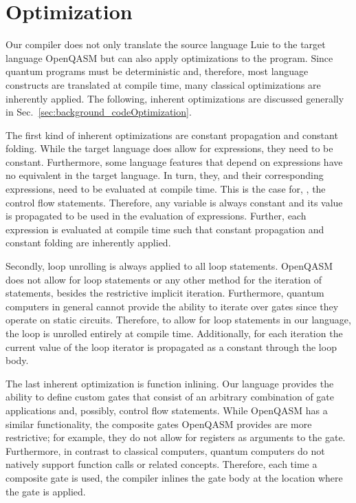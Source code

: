 \section{Optimization}
\label{sec:concept_optimization}
Our compiler does not only translate the source language Luie to the target language OpenQASM but can also apply optimizations to the program. Since quantum programs must be deterministic and, therefore, most language constructs are translated at compile time, many classical optimizations are inherently applied. The following, inherent optimizations are discussed generally in Sec.~\ref{sec:background_codeOptimization}.

The first kind of inherent optimizations are constant propagation and constant folding. 
While the target language does allow for expressions, they need to be constant. Furthermore, some language features that depend on expressions have no equivalent in the target language. In turn, they, and their corresponding expressions, need to be evaluated at compile time. This is the case for, \eg, the control flow statements. Therefore, any variable is always constant and its value is propagated to be used in the evaluation of expressions. Further, each expression is evaluated at compile time such that constant propagation and constant folding are inherently applied.

Secondly, loop unrolling is always applied to all loop statements. OpenQASM does not allow for loop statements or any other method for the iteration of statements, besides the restrictive implicit iteration. Furthermore, quantum computers in general cannot provide the ability to iterate over gates since they operate on static circuits. Therefore, to allow for loop statements in our language, the loop is unrolled entirely at compile time. Additionally, for each iteration the current value of the loop iterator is propagated as a constant through the loop body.   

The last inherent optimization is function inlining. Our language provides the ability to define custom gates that consist of an arbitrary combination of gate applications and, possibly, control flow statements. While OpenQASM has a similar functionality, the composite gates OpenQASM provides are more restrictive; for example, they do not allow for registers as arguments to the gate. Furthermore, in contrast to classical computers, quantum computers do not natively support function calls or related concepts. Therefore, each time a composite gate is used, the compiler inlines the gate body at the location where the gate is applied.   

